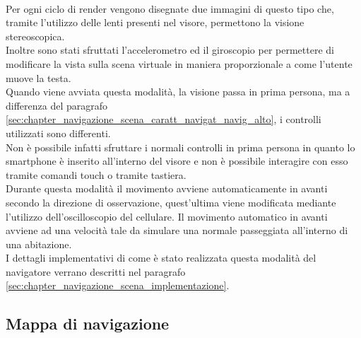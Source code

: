 \\
Per ogni ciclo di render vengono disegnate due immagini di questo tipo che, tramite l’utilizzo delle lenti presenti nel visore, permettono la visione stereoscopica.
\\
Inoltre sono stati sfruttati l’accelerometro ed il giroscopio per permettere di modificare la vista sulla scena virtuale in maniera proporzionale a come l’utente muove la testa.
\\
Quando viene avviata questa modalità, la visione passa in prima persona, ma a differenza del paragrafo \ref{sec:chapter_navigazione_scena_caratt_navigat_navig_alto}, i controlli utilizzati sono differenti.
\\
Non è possibile infatti sfruttare i normali controlli in prima persona in quanto lo smartphone è inserito all’interno del visore e non è possibile interagire con esso tramite comandi touch o tramite tastiera.
\\
Durante questa modalità il movimento avviene automaticamente in avanti secondo la direzione di osservazione, quest’ultima viene modificata mediante l’utilizzo dell’oscilloscopio del cellulare.
Il movimento automatico in avanti avviene ad una velocità tale da simulare una normale passeggiata all’interno di una abitazione.
\\
I dettagli implementativi di come è stato realizzata questa modalità del navigatore verrano descritti nel paragrafo \ref{sec:chapter_navigazione_scena_implementazione}.

\subsection{Mappa di navigazione}
\label{sec:caratteristiche_navigatore_mappa}

